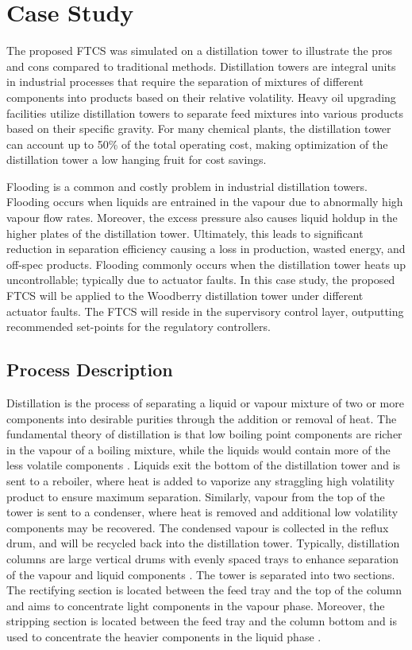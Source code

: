 \section{Case Study}
The proposed FTCS was simulated on a distillation tower to illustrate the pros and cons compared to traditional methods. Distillation towers are integral units in industrial processes that require the separation of
mixtures of different components into products based on their relative volatility. Heavy oil
upgrading facilities utilize distillation towers to separate feed mixtures into various products based on their specific gravity.  For many chemical plants, the distillation tower can account up to 50\% of the total operating cost, making optimization of the distillation tower a low hanging fruit for cost savings.  

Flooding is a common and costly problem in industrial distillation towers.  Flooding occurs when liquids are entrained in the vapour due to abnormally high vapour flow rates.  Moreover, the excess pressure also causes liquid holdup in the higher plates of the distillation tower. Ultimately, this leads to significant reduction in separation efficiency causing a loss in production, wasted energy, and off-spec products. Flooding commonly occurs when the distillation tower heats up uncontrollable; typically due to actuator faults.  In this case study, the proposed FTCS will be applied to the Woodberry distillation tower under different actuator faults. The FTCS will reside in the supervisory control layer, outputting recommended set-points for the regulatory controllers.

\subsection{Process Description}
Distillation is the process of separating a liquid or vapour mixture of two or more components into desirable purities through the addition or removal of heat. The fundamental theory of distillation is that low boiling point components are richer in the vapour of a boiling mixture, while the liquids would contain more of the less volatile components \cite{distillation_intro}.  Liquids exit the bottom of the distillation tower and is sent to a reboiler, where heat is added to vaporize any straggling high volatility product to ensure maximum separation. Similarly, vapour from the top of the tower is sent to a condenser, where heat is removed and additional low volatility components may be recovered. The condensed vapour is collected in the reflux drum, and will be recycled back into the distillation tower. Typically, distillation columns are large vertical drums with evenly spaced trays to enhance separation of the vapour and liquid components \cite{mpc_for_distillation_tower}.  The tower is separated into two sections.  The rectifying section is located between the feed tray and the top of the column and aims to concentrate light components in the vapour phase.  Moreover, the stripping section is located between the feed tray and the column bottom and is used to concentrate the heavier components in the liquid phase \cite{henry_distillation}.

